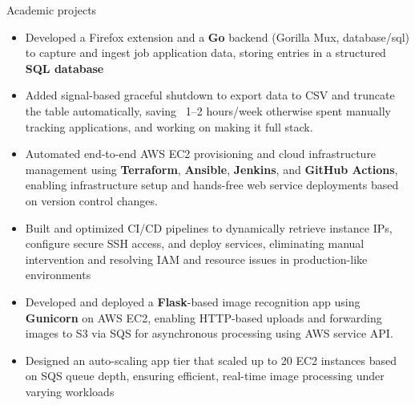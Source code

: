 \documentclass{resume}
\begin{document}
\begin{experienceSection}{Academic projects}

        \projectItem[
        title=JobTrail - Go based job tracking,
        duration={Jun 2024 - Present},
    ]
    \begin{itemize}
        \vspace{-0.5em}
        \itemsep -6pt {}
        \item Developed a Firefox extension and a \textbf{Go} backend (Gorilla Mux, database/sql) to capture and ingest job application data, storing entries in a structured \textbf{SQL database}
        \item Added signal-based graceful shutdown to export data to CSV and truncate the table automatically, saving ~1–2 hours/week otherwise spent manually tracking applications, and working on making it full stack. 
    \end{itemize}

    \projectItem[
        title={End-to-End Deployment Automation},
        duration={Mar 2025 - Apr 2025},
    ]
    \begin{itemize}
        \vspace{-0.5em}
        \itemsep -6pt {}
        \item Automated end-to-end AWS EC2 provisioning and cloud infrastructure management using \textbf{Terraform}, \textbf{Ansible}, \textbf{Jenkins}, and \textbf{GitHub Actions}, enabling infrastructure setup and hands-free web service deployments based on version control changes.
        \item Built and optimized CI/CD pipelines to dynamically retrieve instance IPs, configure secure SSH access, and deploy services, eliminating manual intervention and resolving IAM and resource issues in production-like environments
    \end{itemize}

    \projectItem[
        title=AWS-Based Face Recognition App,
        duration={Feb 2024 - May 2024},
    ]
    \begin{itemize}
        \vspace{-0.5em}
        \itemsep -6pt {}
        \item Developed and deployed a \textbf{Flask}-based image recognition app using \textbf{Gunicorn} on AWS EC2, enabling HTTP-based uploads and forwarding images to S3 via SQS for asynchronous processing using AWS service API.
        \item Designed an auto-scaling app tier that scaled up to 20 EC2 instances based on SQS queue depth, ensuring efficient, real-time image processing under varying workloads
    \end{itemize}
    
\end{experienceSection}
\end{document}
